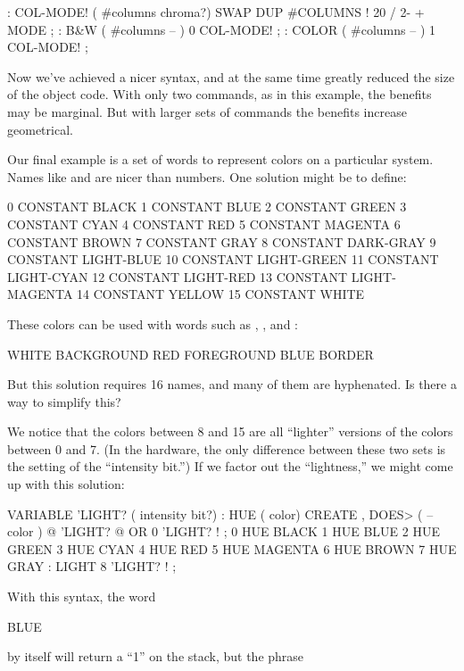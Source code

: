 \begin{Code}
: COL-MODE!  ( #columns chroma?)
   SWAP DUP #COLUMNS !  20 / 2-  +  MODE ;
: B&W    ( #columns -- )  0 COL-MODE! ;
: COLOR  ( #columns -- )  1 COL-MODE! ;
\end{Code}
Now we've achieved a nicer syntax, and at the same time greatly
reduced the size of the object code. With only two commands, as in
this example, the benefits may be marginal. But with larger sets of
commands the benefits increase geometrical.

Our final example is a set of words to represent colors on a
particular system. Names like  and  are nicer
than numbers. One solution might be to define:

\begin{Code}
 0 CONSTANT BLACK                 1 CONSTANT BLUE
 2 CONSTANT GREEN                 3 CONSTANT CYAN
 4 CONSTANT RED                   5 CONSTANT MAGENTA
 6 CONSTANT BROWN                 7 CONSTANT GRAY
 8 CONSTANT DARK-GRAY             9 CONSTANT LIGHT-BLUE
10 CONSTANT LIGHT-GREEN          11 CONSTANT LIGHT-CYAN
12 CONSTANT LIGHT-RED            13 CONSTANT LIGHT-MAGENTA
14 CONSTANT YELLOW               15 CONSTANT WHITE
\end{Code}
These colors can be used with words such as ,
, and :

\begin{Code}
WHITE BACKGROUND  RED FOREGROUND  BLUE BORDER
\end{Code}
But this solution requires 16 names, and many of them are hyphenated.
Is there a way to simplify this?

We notice that the colors between 8 and 15 are all ``lighter''
versions of the colors between 0 and 7. (In the hardware, the only
difference between these two sets is the setting of the ``intensity
bit.'') If we factor out the ``lightness,'' we might come up with this
solution:

\begin{Code}
VARIABLE 'LIGHT?  ( intensity bit?)
: HUE  ( color)  CREATE ,
   DOES>  ( -- color )  @  'LIGHT? @  OR  0 'LIGHT? ! ;
 0 HUE BLACK         1 HUE BLUE           2 HUE GREEN
 3 HUE CYAN          4 HUE RED            5 HUE MAGENTA
 6 HUE BROWN         7 HUE GRAY
: LIGHT   8 'LIGHT? ! ;
\end{Code}
With this syntax, the word

\begin{Code}
BLUE
\end{Code}
by itself will return a ``1'' on the stack, but the phrase

